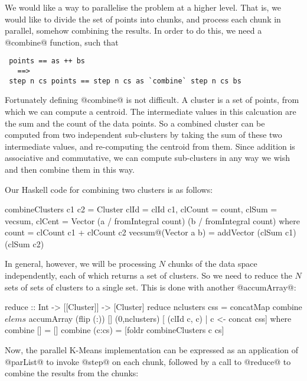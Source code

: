 We would like a way to parallelise the problem at a higher level.
That is, we would like to divide the set of points into chunks, and
process each chunk in parallel, somehow combining the results.  In
order to do this, we need a @combine@ function, such that

{\small \begin{verbatim}
 points == as ++ bs
   ==>
 step n cs points == step n cs as `combine` step n cs bs
\end{verbatim}}

Fortunately defining @combine@ is not difficult.  A cluster is a set
of points, from which we can compute a centroid.  The intermediate
values in this calcuation are the sum and the count of the data
points.  So a combined cluster can be computed from two independent
sub-clusters by taking the sum of these two intermediate values, and
re-computing the centroid from them.  Since addition is associative
and commutative, we can compute sub-clusters in any way we wish and
then combine them in this way.

Our Haskell code for combining two clusters is as follows:

\begin{haskell}
combineClusters c1 c2 =
  Cluster {clId = clId c1,
           clCount = count,
           clSum = vecsum,
           clCent = Vector (a / fromIntegral count)
                           (b / fromIntegral count)}
  where count = clCount c1 + clCount c2
        vecsum@(Vector a b)  = addVector (clSum c1) (clSum c2)
\end{haskell}

\noindent In general, however, we will be processing $N$ chunks of the
data space independently, each of which returns a set of clusters.  So
we need to reduce the $N$ sets of sets of clusters to a single set.
This is done with another @accumArray@:

\begin{haskell}
reduce :: Int -> [[Cluster]] -> [Cluster]
reduce nclusters css =
  concatMap combine $ elems $
    accumArray (flip (:)) [] (0,nclusters)
       [ (clId c, c) | c <- concat css]
 where
  combine [] = []
  combine (c:cs) = [foldr combineClusters c cs]
\end{haskell}

Now, the parallel K-Means implementation can be expressed as an
application of @parList@ to invoke @step@ on each chunk, followed by a
call to @reduce@ to combine the results from the chunks:

